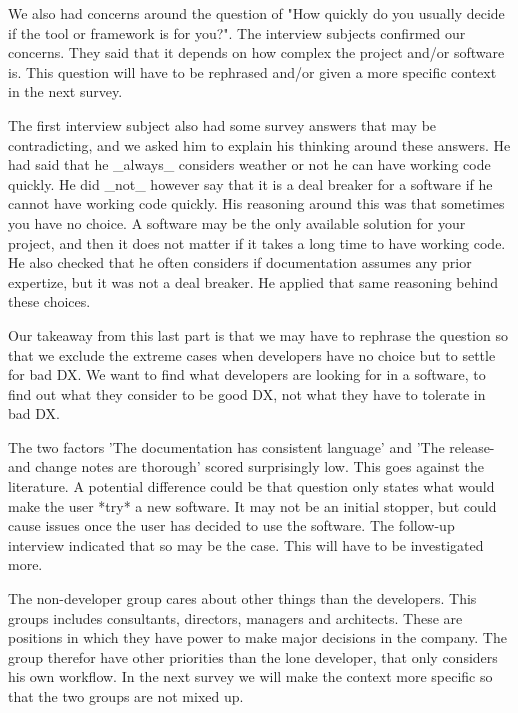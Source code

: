 \documentclass[11pt]{article}
\begin{document}
\begin{multicols}{2}
    We also had concerns around the question of "How quickly do you usually
    decide if the tool or framework is for you?". The interview subjects
    confirmed our concerns. They said that it depends on how complex the
    project and/or software is. This question will have to be rephrased
    and/or given a more specific context in the next survey.

    The first interview subject also had some survey answers that may be
    contradicting, and we asked him to explain his thinking around these
    answers. He had said that he _always_ considers weather or not he can
    have working code quickly. He did _not_ however say that it is a deal
    breaker for a software if he cannot have working code quickly. His
    reasoning around this was that sometimes you have no choice. A software
    may be the only available solution for your project, and then it does
    not matter if it takes a long time to have working code. He also checked
    that he often considers if documentation assumes any prior expertize,
    but it was not a deal breaker. He applied that same reasoning behind
    these choices.

    Our takeaway from this last part is that we may have to rephrase the
    question so that we exclude the extreme cases when developers have no
    choice but to settle for bad DX. We want to find what developers are
    looking for in a software, to find out what they consider to be good DX,
    not what they have to tolerate in bad DX.


    The two factors 'The documentation has consistent language' and 'The
    release- and change notes are thorough' scored surprisingly low. This
    goes against the literature. A potential difference could be that
    question only states what would make the user *try* a new software. It
    may not be an initial stopper, but could cause issues once the user has
    decided to use the software. The follow-up interview indicated that so
    may be the case. This will have to be investigated more.

    The non-developer group cares about other things than the developers.
    This groups includes consultants, directors, managers and architects.
    These are positions in which they have power to make major decisions in
    the company. The group therefor have other priorities than the lone
    developer, that only considers his own workflow. In the next survey we
    will make the context more specific so that the two groups are not mixed
    up.


\end{multicols}
\end{document}
